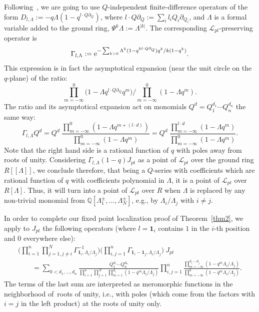 \documentclass[10pt,a4paper]{amsart}
\numberwithin{equation}{section}
\def\L{\mathcal L}
\def\1{\mathbf 1}
\def\QQ{\mathbb Q}
\def\p{\partial}
\theoremstyle{definition}
\theoremstyle{plain}
\begin{document}
Following~\cite{Givental:perm4}, we are going to use $Q$-independent finite-difference operators of the form $D_{l,\Lambda}:=-q \Lambda (1-q^{l\cdot Q\p_Q})$, where $l\cdot Q\p_Q:=\sum_i l_iQ_i\p_{Q_i}$, and $\Lambda$ is a formal variable added to the ground ring, $\Psi^k\Lambda:=\Lambda^{|k|}$. The corresponding $\L_{pt}$-preserving operator is
\[
\Gamma_{l,\Lambda}:= {\rm e}^{ -\sum_{k>0}\Lambda^k
(1-q^{kl\cdot Q\p_Q})q^k/k(1-q^k)}.
\]
This expression is in fact the asymptotical expansion (near the unit circle on the $q$-plane) of the ratio:
\[
\prod_{m=-\infty}^0\big(1-\Lambda q^{l\cdot Q\p_Q}q^m\big)/ \prod_{m=-\infty}^0(1-\Lambda q^m).
\]
The ratio and its asymptotical expansion act on monomials $Q^d=Q_1^{d_1}\cdots Q_n^{d_n}$ the same way:
\[
\Gamma_{l,\Lambda}Q^d= Q^d\ \frac{\prod_{m=-\infty}^0(1-\Lambda q^{m+(l\cdot d)})}{\prod_{m=-\infty}^0(1-\Lambda q^m)} = Q^d\ \frac{\prod_{m=-\infty}^{l\cdot d}(1-\Lambda q^m)}{\prod_{m=-\infty}^0(1-\Lambda q^m)}.
\]
Note that the right hand side is a rational function of $q$ with poles away from roots of unity. Considering $\Gamma_{l,\Lambda}(1-q)J_{pt}$ as a point of $\L_{pt}$ over the ground ring $R[[\Lambda]]$, we conclude therefore, that being a $Q$-series with coefficients which are rational function of $q$ with coefficients polynomial in $\Lambda$, it is a point of $\L_{pt}$ over $R[\Lambda]$. Thus, it will turn into a point of $\L_{pt}$ over $R$ when $\Lambda$ is replaced by any non-trivial monomial from $\QQ[\Lambda_1^{\pm},\dots,\Lambda_N^{\pm}]$, e.g., by $\Lambda_i/\Lambda_j$ with $i\neq j$.

In order to complete our fixed point localization proof of Theorem~\ref{thm2}, we apply to $J_{pt}$ the following operators (where $l=\1_i$ contains $1$ in the $i$-th position and $0$ everywhere else):
\begin{gather*}
\bigg(\prod_{i=1}^n\prod_{j=1, j\neq i}^N \Gamma^{-1}_{\1_i,\Lambda_i/\Lambda_j}\bigg) \bigg(\prod_{i,j=1}^n\Gamma_{\1_i-\1_j,\Lambda_i/\Lambda_j}\bigg)\ J_{pt}
\\ \qquad
{}=\sum_{0<d_1,\dots,d_n}\frac{Q_1^{d_1}\cdots Q_n^{d_n}}{\prod_{i=1}^n\prod_{j=1}^N\prod_{m=1}^{d_i}(1-q^m\Lambda_i/\Lambda_j)} \prod_{i,j=1}^n\frac{\prod_{m=-\infty}^{d_i-d_j}(1-q^m\Lambda_i/\Lambda_j)}{\prod_{m=-\infty}^0(1-q^m\Lambda_i/\Lambda_j)}.
\end{gather*}
The terms of the last sum are interpreted as meromorphic functions in the neighborhood of~roots of unity, i.e., with poles (which come from the factors with $i=j$ in the left product) at the roots of unity only.
\end{document}
